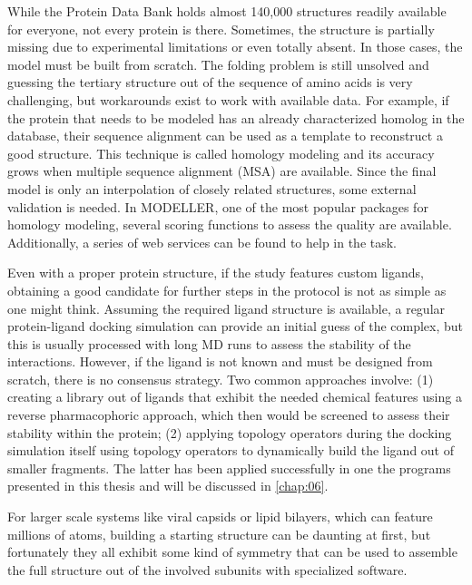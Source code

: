 While the Protein Data Bank holds almost 140,000 structures readily available for everyone, not every protein is there. Sometimes, the structure is partially missing due to experimental limitations or even totally absent. In those cases, the model must be built from scratch. The folding problem is still unsolved and guessing the tertiary structure out of the sequence of amino acids is very challenging, but workarounds exist to work with available data. For example, if the protein that needs to be modeled has an already characterized homolog in the database, their sequence alignment can be used as a template to reconstruct a good structure. This technique is called homology modeling and its accuracy grows when multiple sequence alignment (MSA) are available. Since the final model is only an interpolation of closely related structures, some external validation is needed. In MODELLER, one of the most popular packages for homology modeling, several scoring functions to assess the quality are available. Additionally, a series of web services can be found to help in the task.\cite{errat,benkert2008qmean,wang2011apollo}

Even with a proper protein structure, if the study features custom ligands, obtaining a good candidate for further steps in the protocol is not as simple as one might think. Assuming the required ligand structure is available, a regular protein-ligand docking simulation can provide an initial guess of the complex, but this is usually processed with long MD runs to assess the stability of the interactions. However, if the ligand is not known and must be designed from scratch, there is no consensus strategy. Two common approaches involve: (1) creating a library out of ligands that exhibit the needed chemical features using a reverse pharmacophoric approach, which then would be screened to assess their stability within the protein; (2) applying topology operators during the docking simulation itself using topology operators to dynamically build the ligand out of smaller fragments. The latter has been applied successfully in one the programs presented in this thesis and will be discussed in \autoref{chap:06}.

For larger scale systems like viral capsids or lipid bilayers, which can feature millions of atoms, building a starting structure can be daunting at first, but fortunately they all exhibit some kind of symmetry that can be used to assemble the full structure out of the involved subunits with specialized software.\cite{bietz2016siena,sym}

